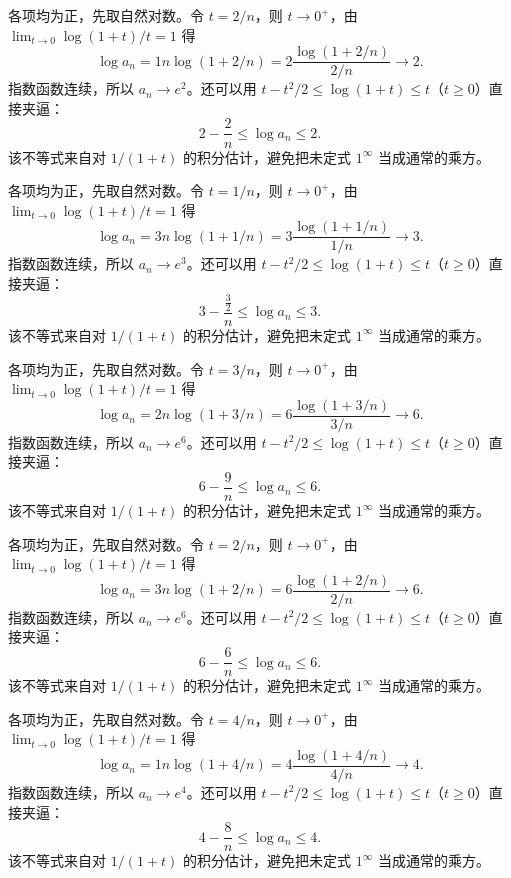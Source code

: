 \documentclass[UTF8,12pt,a4paper,fontset=fandol]{ctexart}
\begin{document}
\begin{solve}\label{ans:c1q14}
各项均为正，先取自然对数。令 $t=2/n$，则 $t\to0^+$，由 $\lim_{t\to0}\log(1+t)/t=1$ 得
\[
\log a_n=1n\log(1+2/n)=2\frac{\log(1+2/n)}{2/n}\longrightarrow 2.
\]
指数函数连续，所以 $a_n\to e^{2}$。还可以用 $t-t^2/2\le\log(1+t)\le t$（$t\ge0$）直接夹逼：
\[
2-\frac{2}n\le\log a_n\le 2.
\]
该不等式来自对 $1/(1+t)$ 的积分估计，避免把未定式 $1^\infty$ 当成通常的乘方。
\end{solve}

\begin{solve}\label{ans:c1q15}
各项均为正，先取自然对数。令 $t=1/n$，则 $t\to0^+$，由 $\lim_{t\to0}\log(1+t)/t=1$ 得
\[
\log a_n=3n\log(1+1/n)=3\frac{\log(1+1/n)}{1/n}\longrightarrow 3.
\]
指数函数连续，所以 $a_n\to e^{3}$。还可以用 $t-t^2/2\le\log(1+t)\le t$（$t\ge0$）直接夹逼：
\[
3-\frac{\frac{3}{2}}n\le\log a_n\le 3.
\]
该不等式来自对 $1/(1+t)$ 的积分估计，避免把未定式 $1^\infty$ 当成通常的乘方。
\end{solve}

\begin{solve}\label{ans:c1q16}
各项均为正，先取自然对数。令 $t=3/n$，则 $t\to0^+$，由 $\lim_{t\to0}\log(1+t)/t=1$ 得
\[
\log a_n=2n\log(1+3/n)=6\frac{\log(1+3/n)}{3/n}\longrightarrow 6.
\]
指数函数连续，所以 $a_n\to e^{6}$。还可以用 $t-t^2/2\le\log(1+t)\le t$（$t\ge0$）直接夹逼：
\[
6-\frac{9}n\le\log a_n\le 6.
\]
该不等式来自对 $1/(1+t)$ 的积分估计，避免把未定式 $1^\infty$ 当成通常的乘方。
\end{solve}

\begin{solve}\label{ans:c1q17}
各项均为正，先取自然对数。令 $t=2/n$，则 $t\to0^+$，由 $\lim_{t\to0}\log(1+t)/t=1$ 得
\[
\log a_n=3n\log(1+2/n)=6\frac{\log(1+2/n)}{2/n}\longrightarrow 6.
\]
指数函数连续，所以 $a_n\to e^{6}$。还可以用 $t-t^2/2\le\log(1+t)\le t$（$t\ge0$）直接夹逼：
\[
6-\frac{6}n\le\log a_n\le 6.
\]
该不等式来自对 $1/(1+t)$ 的积分估计，避免把未定式 $1^\infty$ 当成通常的乘方。
\end{solve}

\begin{solve}\label{ans:c1q18}
各项均为正，先取自然对数。令 $t=4/n$，则 $t\to0^+$，由 $\lim_{t\to0}\log(1+t)/t=1$ 得
\[
\log a_n=1n\log(1+4/n)=4\frac{\log(1+4/n)}{4/n}\longrightarrow 4.
\]
指数函数连续，所以 $a_n\to e^{4}$。还可以用 $t-t^2/2\le\log(1+t)\le t$（$t\ge0$）直接夹逼：
\[
4-\frac{8}n\le\log a_n\le 4.
\]
该不等式来自对 $1/(1+t)$ 的积分估计，避免把未定式 $1^\infty$ 当成通常的乘方。
\end{solve}
\end{document}
